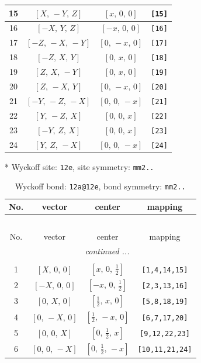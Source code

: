 \documentclass[fleqn,8pt]{jsarticle}
\begin{document}
\begin{longtable}{cccc}
15 & $\left[ X,\, - Y,\, Z \right]$ & $\left[ x,\, 0,\, 0 \right]$ & {\tt [15]} \\ \hline
16 & $\left[ - X,\, Y,\, Z \right]$ & $\left[ - x,\, 0,\, 0 \right]$ & {\tt [16]} \\ \hline
17 & $\left[ - Z,\, - X,\, - Y \right]$ & $\left[ 0,\, - x,\, 0 \right]$ & {\tt [17]} \\ \hline
18 & $\left[ - Z,\, X,\, Y \right]$ & $\left[ 0,\, x,\, 0 \right]$ & {\tt [18]} \\ \hline
19 & $\left[ Z,\, X,\, - Y \right]$ & $\left[ 0,\, x,\, 0 \right]$ & {\tt [19]} \\ \hline
20 & $\left[ Z,\, - X,\, Y \right]$ & $\left[ 0,\, - x,\, 0 \right]$ & {\tt [20]} \\ \hline
21 & $\left[ - Y,\, - Z,\, - X \right]$ & $\left[ 0,\, 0,\, - x \right]$ & {\tt [21]} \\ \hline
22 & $\left[ Y,\, - Z,\, X \right]$ & $\left[ 0,\, 0,\, x \right]$ & {\tt [22]} \\ \hline
23 & $\left[ - Y,\, Z,\, X \right]$ & $\left[ 0,\, 0,\, x \right]$ & {\tt [23]} \\ \hline
24 & $\left[ Y,\, Z,\, - X \right]$ & $\left[ 0,\, 0,\, - x \right]$ & {\tt [24]} \\
\end{longtable}
* Wyckoff site: {\tt 12e}, site symmetry: {\tt mm2..}
\renewcommand{\arraystretch}{1.2}
\begin{longtable}{cccc}
\caption{Wyckoff bond: {\tt 12a@12e}, bond symmetry: {\tt mm2..}}
 \\
 \hline \hline
No. & vector & center & mapping \\ \hline \endfirsthead

\multicolumn{3}{l}{\tablename\ \thetable{}} \\
 \hline \hline
No. & vector & center & mapping \\ \hline \endhead

 \hline \hline
\multicolumn{3}{r}{\footnotesize\it continued ...} \\ \endfoot

 \hline \hline
\multicolumn{3}{r}{} \\ \endlastfoot

1 & $\left[ X,\, 0,\, 0 \right]$ & $\left[ x,\, 0,\, \frac{1}{2} \right]$ & {\tt [1,4,14,15]} \\ \hline
2 & $\left[ - X,\, 0,\, 0 \right]$ & $\left[ - x,\, 0,\, \frac{1}{2} \right]$ & {\tt [2,3,13,16]} \\ \hline
3 & $\left[ 0,\, X,\, 0 \right]$ & $\left[ \frac{1}{2},\, x,\, 0 \right]$ & {\tt [5,8,18,19]} \\ \hline
4 & $\left[ 0,\, - X,\, 0 \right]$ & $\left[ \frac{1}{2},\, - x,\, 0 \right]$ & {\tt [6,7,17,20]} \\ \hline
5 & $\left[ 0,\, 0,\, X \right]$ & $\left[ 0,\, \frac{1}{2},\, x \right]$ & {\tt [9,12,22,23]} \\ \hline
6 & $\left[ 0,\, 0,\, - X \right]$ & $\left[ 0,\, \frac{1}{2},\, - x \right]$ & {\tt [10,11,21,24]} \\
\end{longtable}
\end{document}
